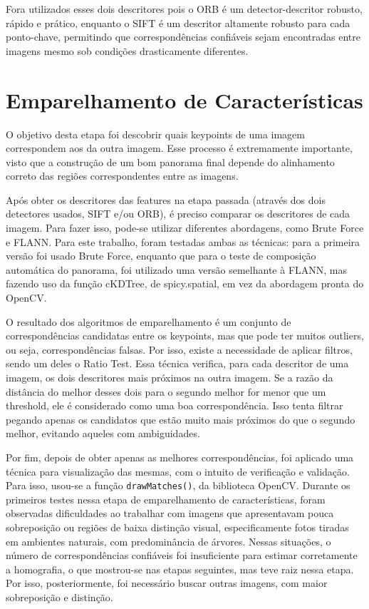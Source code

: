 \documentclass[12pt]{article}
\begin{document}
Fora utilizados esses dois descritores pois o ORB é um  detector-descritor robusto, rápido e prático, enquanto o SIFT  é um descritor altamente robusto para cada ponto-chave, permitindo que correspondências confiáveis sejam encontradas entre imagens mesmo sob condições drasticamente diferentes.

\section{Emparelhamento de Características}

O objetivo desta etapa foi descobrir quais keypoints de uma imagem correspondem aos da outra imagem. Esse processo é extremamente importante, visto que a construção de um bom panorama final depende do alinhamento correto das regiões correspondentes entre as imagens. 

Após obter os descritores das features na etapa passada (através dos dois detectores usados, SIFT e/ou ORB), é preciso comparar os descritores de cada imagem. Para fazer isso, pode-se utilizar diferentes abordagens, como Brute Force e FLANN. Para este trabalho, foram testadas ambas as técnicas: para a primeira versão foi usado Brute Force, enquanto que para o teste de composição automática do panorama, foi utilizado uma versão semelhante à FLANN, mas fazendo uso da função cKDTree, de spicy.spatial, em vez da abordagem pronta do OpenCV.

O resultado dos algoritmos de emparelhamento é um conjunto de correspondências candidatas entre os keypoints, mas que pode ter muitos outliers, ou seja, correspondências falsas. Por isso, existe a necessidade de aplicar filtros, sendo um deles o Ratio Test. Essa técnica verifica, para cada descritor de uma imagem, os dois descritores mais próximos na outra imagem. Se a razão da distância do melhor desses dois para o segundo melhor for menor que um threshold, ele é considerado como uma boa correspondência. Isso tenta filtrar pegando apenas os candidatos que estão muito mais próximos do que o segundo melhor, evitando aqueles com ambiguidades.

Por fim, depois de obter apenas as melhores correspondências, foi aplicado uma técnica para visualização das mesmas, com o intuito de verificação e validação. Para isso, usou-se a função \texttt{drawMatches()}, da biblioteca OpenCV.
Durante os primeiros testes nessa etapa de emparelhamento de características, foram observadas dificuldades ao trabalhar com imagens que apresentavam pouca sobreposição ou regiões de baixa distinção visual, especificamente fotos tiradas em ambientes naturais, com predominância de árvores. Nessas situações, o número de correspondências confiáveis foi insuficiente para estimar corretamente a homografia, o que mostrou-se nas etapas seguintes, mas teve raiz nessa etapa. Por isso, posteriormente, foi necessário buscar outras imagens, com maior sobreposição e distinção.
\end{document}
